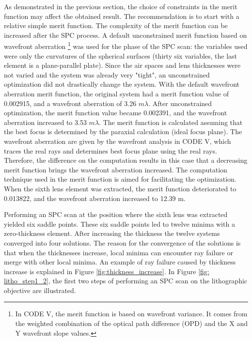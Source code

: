 As demonstrated in the previous section, the choice of constraints in the merit function may affect the obtained result. The recommendation is to start with a relative simple merit function. The complexity of the merit function can be increased after the SPC process. A default unconstrained merit function based on wavefront aberration \footnote{In CODE V, the merit function is based on wavefront variance. It comes from the weighted combination of the optical path difference (OPD) and the X and Y wavefront slope values.} was used for the phase of the SPC scan: the variables used were only the curvatures of the spherical surfaces (thirty six variables, the last element is a plane-parallel plate). Since the air spaces and lens thicknesses were not varied and the system was already very "tight", an unconstrained optimization did not drastically change the system. With the default wavefront aberration merit function, the original system had a merit function value of 0.002915, and a wavefront aberration of 3.26 $m\lambda$. After unconstrained optimization, the merit function value became 0.002391, and the wavefront aberration increased to 3.53 $m\lambda$. The merit function is calculated assuming that the best focus is determined by the paraxial calculation (ideal focus plane). The wavefront aberration are given by the wavefront analysis in CODE V, which traces the real rays and determines best focus plane using the real rays. Therefore, the difference on the computation results in this case that a decreasing merit function brings the wavefront aberration increased. The computation technique used in the merit function is aimed for facilitating the optimization. When the sixth lens element was extracted, the merit function deteriorated to 0.013822, and the wavefront aberration increased to 12.39 m\textlambda.

Performing an SPC scan at the position where the sixth lens was extracted yielded six saddle points. These six saddle points led to twelve minima with a zero-thickness element. After increasing the thickness the twelve systems converged into four solutions. The reason for the convergence of the solutions is that when the thicknesses increase, local minima can encounter ray failure or merge with other local minima. An example of ray failure caused by thickness increase is explained in Figure \ref{fig:thickness_increase}. In Figure \ref{fig: litho_step1_2}, the first two steps of performing an SPC scan on the lithographic objective are illustrated.

